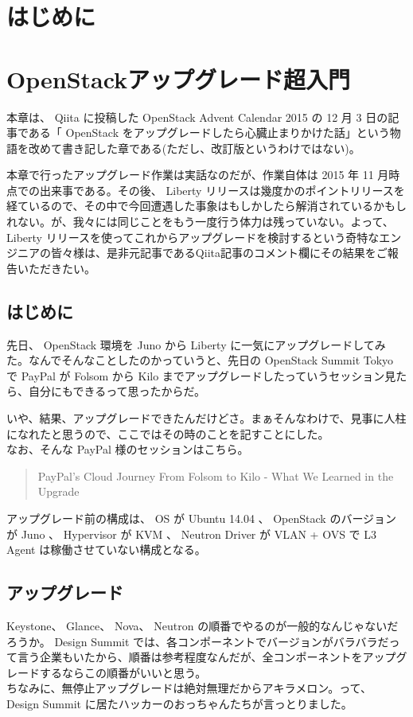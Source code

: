 \documentclass[9pt,b5paper,tombo,openany]{jsbook}
\begin{document}
\tableofcontents

\chapter{はじめに}

\setcounter{page}{1}

\chapter{OpenStackアップグレード超入門}
本章は、 Qiita に投稿した OpenStack Advent Calendar 2015 の 12 月 3 日の記事である「 OpenStack をアップグレードしたら心臓止まりかけた話」という物語を改めて書き記した章である(ただし、改訂版というわけではない)。

本章で行ったアップグレード作業は実話なのだが、作業自体は 2015 年 11 月時点での出来事である。その後、 Liberty リリースは幾度かのポイントリリースを経ているので、その中で今回遭遇した事象はもしかしたら解消されているかもしれない。が、我々には同じことをもう一度行う体力は残っていない。よって、 Liberty リリースを使ってこれからアップグレードを検討するという奇特なエンジニアの皆々様は、是非元記事であるQiita記事のコメント欄にその結果をご報告いただきたい。

\section{はじめに}
先日、 OpenStack 環境を Juno から Liberty に一気にアップグレードしてみた。なんでそんなことしたのかっていうと、先日の OpenStack Summit Tokyo で PayPal が Folsom から Kilo までアップグレードしたっていうセッション見たら、自分にもできるって思ったからだ。

いや、結果、アップグレードできたんだけどさ。まぁそんなわけで、見事に人柱になれたと思うので、ここではその時のことを記すことにした。\\[1ex]

\noindent
なお、そんな PayPal 様のセッションはこちら。

\begin{quote}
	PayPal's Cloud Journey From Folsom to Kilo - What We Learned in the Upgrade
\end{quote}

アップグレード前の構成は、 OS が Ubuntu 14.04 、 OpenStack のバージョンが Juno 、 Hypervisor が KVM 、 Neutron Driver が VLAN + OVS で L3 Agent は稼働させていない構成となる。

\section{アップグレード}
Keystone、 Glance、 Nova、 Neutron の順番でやるのが一般的なんじゃないだろうか。 Design Summit では、各コンポーネントでバージョンがバラバラだって言う企業もいたから、順番は参考程度なんだが、全コンポーネントをアップグレードするならこの順番がいいと思う。\\[1ex]
ちなみに、無停止アップグレードは絶対無理だからアキラメロン。って、 Design Summit に居たハッカーのおっちゃんたちが言っとりました。\\[1ex]
\end{document}
